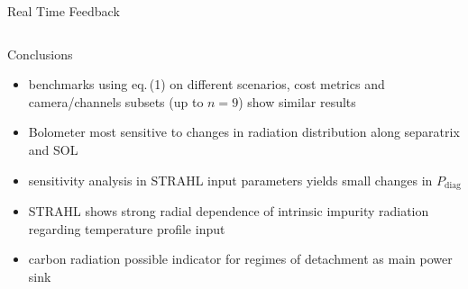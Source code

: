 \documentclass[final]{beamer}
\newcommand{\ix}[1]{_\text{#1}}
\begin{document}
\begin{frame}
\begin{minipage}[t]{0.6\textwidth}
\begin{kasten}{Real Time Feedback}
\begin{columns}
                    \begin{kasten2}{Conclusions}\small{%
                        \begin{itemize}%
                            \item{%
                                benchmarks using eq.\,(1) on different %
                                scenarios, cost metrics and camera/channels %
                                subsets (up to $n=9$) show similar results}
                            \item{%
                                Bolometer most sensitive to changes %
                                in radiation distribution along separatrix %
                                and SOL}%
                            \item{%
                                sensitivity analysis in STRAHL input %
                                parameters yields small changes in %
                                $P\ix{diag}$}%
                            \item{%
                                STRAHL shows strong radial dependence of %
                                intrinsic impurity radiation regarding %
                                temperature profile input}%
                            \item{%
                                carbon radiation possible indicator for %
                                regimes of detachment as main power sink}%
                        \end{itemize}%
                    }\end{kasten2}%

            \end{columns}%
        \end{kasten}%
        \vfill%
    \end{minipage}%

\end{frame}
\end{document}
